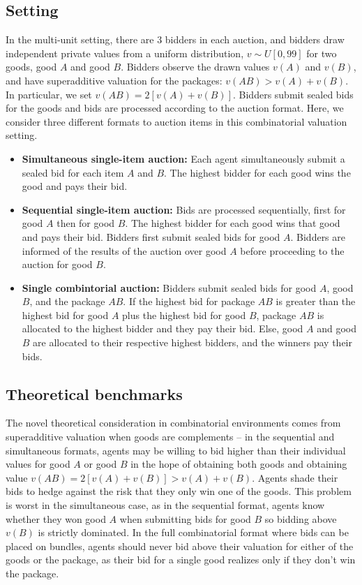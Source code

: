 \documentclass{article} %
\begin{document}
\subsection{Setting} In the multi-unit setting, there are 3 bidders in each auction, and bidders draw independent private values from a uniform distribution, $v \sim U[0, 99]$ for two goods, good $A$ and good $B$. Bidders observe the drawn values $v(A)$ and $v(B)$, and have superadditive valuation for the packages: $v(AB) > v(A) + v(B)$. In particular, we set $v(AB) = 2[v(A) + v(B)]$. Bidders submit sealed bids for the goods and bids are processed according to the auction format. Here, we consider three different formats to auction items in this combinatorial valuation setting.
\begin{itemize}
    \item \textbf{Simultaneous single-item auction:} Each agent simultaneously submit a sealed bid for each item $A$ and $B$. The highest bidder for each good wins the good and pays their bid. \vspace{1mm}
    
    \item \textbf{Sequential single-item auction:} Bids are processed sequentially, first for good $A$ then for good $B$. The highest bidder for each good wins that good and pays their bid. Bidders first submit sealed bids for good $A$. Bidders are informed of the results of the auction over good $A$ before proceeding to the auction for good $B$. \vspace{1mm}
    
    \item \textbf{Single combintorial auction:} Bidders submit sealed bids for good $A$, good $B$, and the package $AB$. If the highest bid for package $AB$ is greater than the highest bid for good $A$ plus the highest bid for good $B$, package $AB$ is allocated to the highest bidder and they pay their bid. Else, good $A$ and good $B$ are allocated to their respective highest bidders, and the winners pay their bids. 
\end{itemize}

\subsection{Theoretical benchmarks}
The novel theoretical consideration in combinatorial environments comes from superadditive valuation when goods are complements -- in the sequential and simultaneous formats, agents may be willing to bid higher than their individual values for good $A$ or good $B$ in the hope of obtaining both goods and obtaining value $v(AB) = 2[v(A) + v(B)] > v(A)+v(B)$. Agents shade their bids to hedge against the risk that they only win one of the goods. This problem is worst in the simultaneous case, as in the sequential format, agents know whether they won good $A$ when submitting bids for good $B$ so bidding above $v(B)$ is strictly dominated. In the full combinatorial format where bids can be placed on bundles, agents should never bid above their valuation for either of the goods or the package, as their bid for a single good realizes only if they don't win the package.
\end{document}
